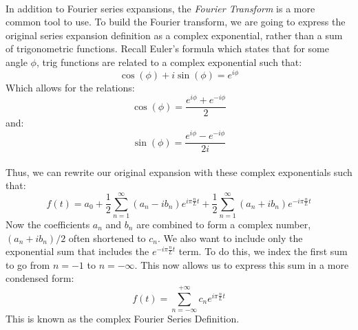\documentclass[12pt,letterpaper]{article}
\begin{document}
\paragraph*{}In addition to Fourier series expansions, the \textit{Fourier Transform} is a more common tool to use. To build the Fourier transform, we are going to express the original series expansion definition as a complex exponential, rather than a sum of trigonometric functions. Recall Euler's formula which states that for some angle $\phi$, trig functions are related to a complex exponential such that:
\begin{equation}
\label{euler}
\cos(\phi) + i\sin(\phi) = e^{i\phi}
\end{equation}
Which allows for the relations:
\begin{equation}
\cos(\phi) = \frac{e^{i\phi}+e^{-i\phi}}{2}
\end{equation}
and:
\begin{equation}
\sin(\phi) = \frac{e^{i\phi}-e^{-i\phi}}{2i}
\end{equation}
\paragraph*{}Thus, we can rewrite our original expansion with these complex exponentials such that:
\begin{equation}
f(t) = a_0 + \frac{1}{2} \sum_{n=1}^{\infty} (a_n - ib_n)e^{i\pi\frac{n}{L}t} +
\frac{1}{2} \sum_{n=1}^{\infty} (a_n + ib_n)e^{-i\pi\frac{n}{L}t}
\end{equation}
Now the coefficients $a_n$ and $b_n$ are combined to form a complex number, 
$(a_n + ib_n)/2$ often shortened to $c_n$. We also want to include only the exponential sum that includes the $e^{-i\pi\frac{n}{L}t}$ term. To do this, we index the first sum to go from $n = -1$ to $n = -\infty$.
This now allows us to express this sum in a more condensed form:
\begin{equation}
\label{complex series def}
f(t) = \sum_{n=-\infty}^{+\infty} c_n e^{i\pi\frac{n}{L}t}
\end{equation}
This is known as the complex Fourier Series Definition.



\end{document}
